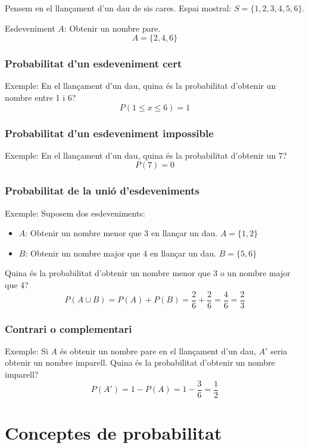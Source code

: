 \documentclass[12pt]{article}
\begin{document}
\begin{exemple} \noindent Pensem en el llançament d'un dau de sis cares. Espai mostral: $S = \{1, 2, 3, 4, 5, 6\}$.

Esdeveniment $A$: Obtenir un nombre pare. 
\[
A = \{2, 4, 6\}
\]
\end{exemple}

\begin{exemple} \noindent 
\subsubsection*{Probabilitat d'un esdeveniment cert}
Exemple: En el llançament d'un dau, quina és la probabilitat d'obtenir un nombre entre 1 i 6?
\[
P(1 \leq x \leq 6) = 1
\]

\subsubsection*{Probabilitat d'un esdeveniment impossible}
Exemple: En el llançament d'un dau, quina és la probabilitat d'obtenir un 7?
\[
P(7) = 0
\]

\subsubsection*{Probabilitat de la unió d'esdeveniments}
Exemple: Suposem dos esdeveniments:
\begin{itemize}
    \item $A$: Obtenir un nombre menor que 3 en llançar un dau. $A = \{1, 2\}$
    \item $B$: Obtenir un nombre major que 4 en llançar un dau. $B = \{5, 6\}$
\end{itemize}

Quina és la probabilitat d'obtenir un nombre menor que 3 o un nombre major que 4? 
\[
P(A \cup B) = P(A) + P(B) = \frac{2}{6} + \frac{2}{6} = \frac{4}{6} = \frac{2}{3}
\]

\subsubsection*{Contrari o complementari}
Exemple: Si $A$ és obtenir un nombre pare en el llançament d'un dau, $A'$ seria obtenir un nombre imparell. Quina és la probabilitat d'obtenir un nombre imparell?
\[
P(A') = 1 - P(A) = 1 - \frac{3}{6} = \frac{1}{2}
\]
\end{exemple}


\section{Conceptes de probabilitat}
\end{document}
